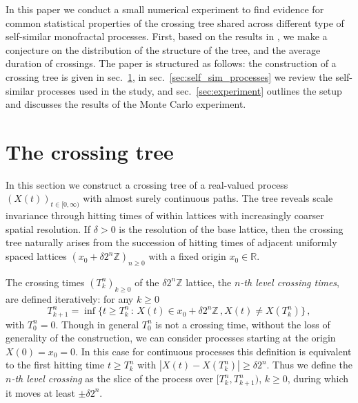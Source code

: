 \documentclass[a4paper]{article}
\newcommand{\Real}{\mathbb{R}}
\begin{document}
In this paper we conduct a small numerical experiment to find evidence for common
statistical properties of the crossing tree shared across different type of self-similar
monofractal processes. First, based on the results in \cite{ECP1673}, we make a
conjecture on the distribution of the structure of the tree, and the average duration
of crossings. The paper is structured as follows: the construction of a crossing tree
is given in sec.~\ref{sec:the_crossing_tree}, in sec.~\ref{sec:self_sim_processes}
we review the self-similar processes used in the study, and sec.~\ref{sec:experiment}
outlines the setup and discusses the results of the Monte Carlo experiment.


\section{The crossing tree} %
\label{sec:the_crossing_tree}

In this section we construct a crossing tree of a real-valued process $(X(t))_{t\in[0, \infty)}$
with almost surely continuous paths. The tree reveals scale invariance through hitting
times of within lattices with increasingly coarser spatial resolution. If $\delta>0$
is the resolution of the base lattice, then the crossing tree naturally arises from
the succession of hitting times of adjacent uniformly spaced lattices $(x_0 + \delta 2^n \mathbb{Z})_{n\geq 0}$
with a fixed origin $x_0\in \Real$.

The crossing times $(T_k^n)_{k\geq0}$ of the $\delta 2^n \mathbb{Z}$ lattice, the
\emph{$n$-th level crossing times}, are defined iteratively: for any $k\geq 0$
\begin{equation} \label{eq:xing_time}
  T_{k+1}^n = \inf\bigl\{t\geq T_k^n\,:\,
        X(t)\in x_0 + \delta 2^n \mathbb{Z}\,, X(t)\neq X(T^n_k)
    \bigr\} \,,
\end{equation}
with $T_0^n = 0$. Though in general $T_0^n$ is not a crossing time, without the
loss of generality of the construction, we can consider processes starting at the
origin $X(0)=x_0=0$. In this case for continuous processes this definition is equivalent
to the first hitting time $t\geq T_k^n$ with $|X(t) - X(T^n_k)| \geq \delta 2^n$.
Thus we define the \emph{$n$-th level crossing} as the slice of the process over
$[T_k^n, T_{k+1}^n)$, $k\geq 0$, during which it moves at least $\pm \delta 2^n$.
\end{document}
